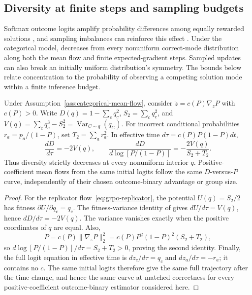\subsection{Diversity at finite steps and sampling budgets}
\label{app:finite-time-diversity}

Softmax outcome logits amplify probability differences among equally rewarded
solutions \citep[Theorem~3.1 and App.~A.1]{sinha2026expected}, and
sampling imbalances can reinforce this effect
\citep[Section~4.2]{lochab2026ucpo}. Under the categorical model,
\pmd{} decreases from every nonuniform correct-mode distribution along
both the mean flow and finite expected-gradient steps. Sampled updates can
also break an initially uniform distribution's symmetry. The bounds below
relate concentration to the probability of observing a competing solution
mode within a finite inference budget.

\begin{proposition}
\enforcehalffinalproseline
\label{prop:pcmd-drift}
Under Assumption~\ref{ass:categorical-mean-flow}, consider
$\dot z=c(P)\nabla_zP$ with $c(P)>0$. Write
$D(q)=1-\sum_cq_c^2$, $S_2=\sum_cq_c^2$, and
$V(q)=\sum_cq_c^3-S_2^2=\operatorname{Var}_{C\sim q}(q_C)$.
For incorrect conditional probabilities $r_a=p_a/(1-P)$, set
$T_2=\sum_ar_a^2$. In effective time $d\tau=c(P)P(1-P)dt$,
\begin{equation}
 \frac{dD}{d\tau}=-2V(q),
 \qquad
 \frac{dD}{d\log[P/(1-P)]}
 =-\frac{2V(q)}{S_2+T_2}.
 \label{eq:pcmd-drift}
\end{equation}
Thus diversity strictly decreases at every nonuniform interior $q$.
Positive-coefficient mean flows from the same initial logits follow the same
$D$-versus-$P$ curve, independently of their chosen outcome-binary advantage or
group size.
\end{proposition}

\begin{proof}
\enforcehalffinalproseline
For the replicator flow~\eqref{eq:grpo-replicator}, the potential
$U(q)=S_2/2$ has fitness $\partial U/\partial q_c=q_c$.
The fitness-variance identity of
\citet[Theorems~1--2]{harper2009informationgeometry} gives
$dU/d\tau=V(q)$, hence $dD/d\tau=-2V(q)$.
The variance vanishes exactly when the
positive coordinates of $q$ are equal. Also,
\[
 \dot P=c(P)\|\nabla_zP\|_2^2
       =c(P)P^2(1-P)^2(S_2+T_2),
\]
so $d\log[P/(1-P)]/d\tau=S_2+T_2>0$, proving the second identity.
Finally, the full logit equation in effective time is
$dz_c/d\tau=q_c$ and $dz_a/d\tau=-r_a$; it contains no $c$.
The same initial logits therefore give the same full trajectory after the
time change, and hence the same curve at matched correctness for every positive-coefficient outcome-binary estimator considered here.
\end{proof}

